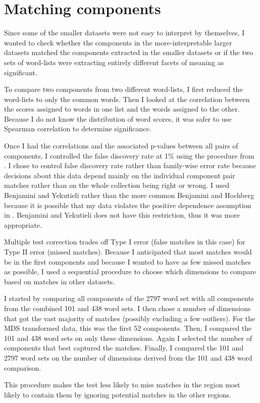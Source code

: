 \documentclass[eric_thesis.tex]{subfiles}
\begin{document}
\section{Matching components}
\label{sec:matchingcomponents}
Since some of the smaller datasets were not easy to interpret by themselves, I
wanted to check whether the components in the more-interpretable larger datasets
matched the components extracted in the smaller datasets or if the two sets
of word-lists were extracting entirely different facets of meaning as
significant.

To compare two components from two different word-lists, I first reduced the
word-lists to only the common words. Then I looked at the correlation between
the scores assigned to words in one list and the words assigned to the other.
Because I do not know the distribution of word scores, it was safer to use
Spearman correlation to determine significance.

Once I had the correlations and the associated p-values between all pairs of
components, I controlled the false discovery rate at 1\% using the procedure
from . I chose to control false discovery 
rate rather than
family-wise error rate because decisions about this data depend mainly on the
individual component pair matches rather than on the whole collection being 
right or wrong. I used Benjamini and Yekutieli rather than the more common
Benjamini and Hochberg because it is possible that my data violates the 
positive dependence assumption in 
. Benjamini and Yekutieli does not have this restriction, thus it was
more appropriate.

Multiple test correction trades off Type I error (false matches in this case) 
for Type II error (missed matches). Because I anticipated that most matches
would be in the first components and because I wanted to have as few missed
matches as possible, I used a sequential procedure to choose which dimensions
to compare based on matches in other datasets.

I started by comparing all components of the 2797 word set with all 
components from the combined 101 and 438 word sets. I then chose a number of
dimensions that got the vast majority of matches (possibly excluding a few
outliers). For the MDS transformed data, this was the first 52 components. 
Then, I compared the 101 and 438 word sets on only these dimensions. Again I
selected the number of components that best captured the matches. Finally,
I compared the 101 and 2797 word sets on the number of dimensions derived from
the 101 and 438 word comparison. 

This procedure makes the test less likely to miss matches in the region most
likely to contain them by ignoring potential matches in the other regions.
\end{document}
